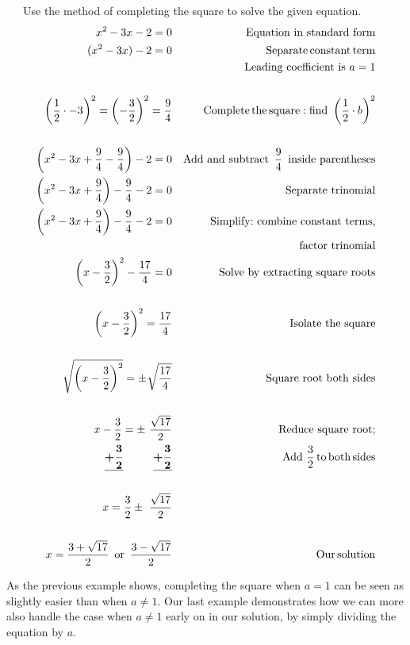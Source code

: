 \newpage

\begin{example}~~~Use the method of completing the square to solve the given equation.
  \begin{eqnarray*}
    x^2-3x-2 = 0 &  & \text{Equation~in~standard~form}\\
    (x^2 -3x)-2=0 &  & \operatorname{Separate} \operatorname{constant} \operatorname{term}\\
    &  & \text{Leading~coefficient~is~} a=1\\
    &&\\
		\left( \frac{1}{2} \cdot -3 \right)^2 = \left(-\frac{3}{2}\right)^2 = \frac{9}{4} &  & \operatorname{Complete}
    \operatorname{the} \operatorname{square} : \text{find~}\left( \frac{1}{2} \cdot b \right)^2\\
    &&\\
		\left(x^2 -3x+\frac{9}{4}-\frac{9}{4}\right)-2=0 &  & \operatorname{Add~and~subtract~} \frac{9}{4}
    \operatorname{~inside~parentheses}\\
    \left(x^2 -3x+\frac{9}{4}\right)-\frac{9}{4}-2=0 &  & \operatorname{Separate~trinomial}\\
    \left(x^2 -3x+\frac{9}{4}\right)-\frac{9}{4}-2=0 &  & \text{Simplify:~combine~constant~terms,}\\
		& & ~~~\text{factor~trinomial}\\
		\left(x - \frac{3}{2}\right)^2 -\frac{17}{4}= 0&&\operatorname{Solve~by~extracting~square~roots}\\
    &&\\
		\left(x - \frac{3}{2}\right)^2 =\frac{17}{4}&&\operatorname{Isolate~the~square}\\
		&&\\
		\sqrt[]{\left(x - \frac{3}{2}\right)^2} = \pm~ \sqrt[]{\frac{17}{4}} &  & \operatorname{Square~root~both~sides}\\
    &&\\
		x - \frac{3}{2} = \pm~ \frac{\sqrt{17}}{2} &  & \operatorname{Reduce~square~root;}\\
		\boldsymbol{\underline{+ \frac{3}{2}}~~~~~~~~\underline{+ \frac{3}{2}}}  && \text{Add~} \frac{3}{2} \operatorname{to} \operatorname{both} \operatorname{sides}\\
    &&\\
		x = \frac{3}{2}\pm~ \frac{\sqrt{17}}{2}&  &\\
    &&\\
		x = \frac{3+\sqrt{17}}{2} \operatorname{~or~} \frac{3-\sqrt{17}}{2} &  & \operatorname{Our} \operatorname{solution}
  \end{eqnarray*}
\end{example}
As the previous example shows, completing the square when $a=1$ can be seen as slightly easier than when $a\neq 1$.  Our last example demonstrates how we can more also handle the case when $a\neq 1$ early on in our solution, by simply dividing the equation by $a$.

